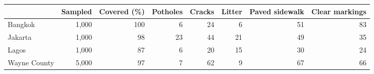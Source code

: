 \begin{tabular}{lrrrrrrr}
\toprule
 & Sampled & Covered (\%) & Potholes & Cracks & Litter & Paved sidewalk & Clear markings \\
\midrule
Bangkok & 1,000 & 100 & 6 & 24 & 6 & 51 & 83 \\
Jakarta & 1,000 & 98 & 23 & 44 & 21 & 49 & 35 \\
Lagos & 1,000 & 87 & 6 & 20 & 15 & 30 & 24 \\
Wayne County & 5,000 & 97 & 7 & 62 & 9 & 67 & 66 \\
\bottomrule
\end{tabular}
